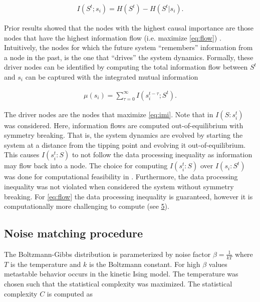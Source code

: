 \documentclass[a4paper, 11pt, twocolumn]{article}
\begin{document}
\begin{equation}
\label{eq:flow}
\begin{split}
I(S^t; s_i) = H(S^t) - H(S^t | s_i).
\end{split}
\end{equation}

Prior results showed that the nodes with the highest causal importance
are those nodes that have the highest information flow (i.e. maximize
\ref{eq:flow}) \cite{vanElteren2022}. Intuitively, the nodes
for which the future system ``remembers'' information from a node in the
past, is the one that ``drives'' the system dynamics. Formally, these
driver nodes can be identified by computing the total information flow
between \(S^t\) and \(s_i\) can be captured with the integrated mutual
information \cite{vanElteren2021}

\begin{equation}
\label{eq:imi}
\begin{split}
\mu(s_i) = \sum_{\tau = 0}^{\infty} I(s_{i}^{t-\tau} ; S^t).
\end{split}
\end{equation}

The driver nodes are the nodes that maximize \ref{eq:imi}. Note
that in \cite{vanElteren2022} \(I(S  :  s_i^{t})\) was considered.
Here, information flows are computed out-of-equilibrium with symmetry
breaking. That is, the system dynamics are evolved by starting the
system at a distance from the tipping point and evolving it
out-of-equilibrium. This causes \(I(s_i^t : S)\) to not follow the data
processing inequality as information may flow back into a node. The
choice for computing \(I(s_i^t :  S)\) over \(I(s_i  : S^t)\) was done
for computational feasibility in \cite{vanElteren2022}. Furthermore,
the data processing inequality was not violated when considered the
system without symmetry breaking. For \ref{eq:flow} the data
processing inequality is guaranteed, however it is computationally more
challenging to compute (see \hyperref[sec:org26f073f]{5}).

\subsection{Noise matching procedure}
\label{sec:org11ee4e3}
The Boltzmann-Gibbs distribution is parameterized by noise factor
\(\beta =  \frac{1}{kT}\) where \(T\) is the temperature and \(k\) is
the Boltzmann constant. For high \(\beta\) values metastable behavior
occurs in the kinetic Ising model. The temperature was chosen such that
the statistical complexity \cite{Lopez-Ruiz1995a} was maximized. The
statistical complexity \(C\) is computed as
\end{document}
